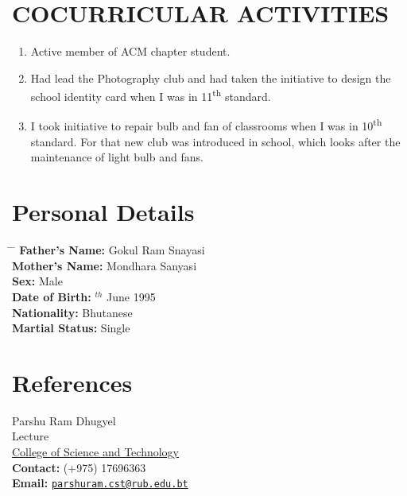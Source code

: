\documentclass[10pt]{article}
\begin{document}
	\section{COCURRICULAR ACTIVITIES}
	\begin{enumerate}
		\item  {Active member of ACM chapter student.}
		\item  {Had lead the Photography club and had taken the initiative to design the school identity card when I was in 11\textsuperscript{th} standard.}
		\item  {I took initiative to repair bulb and fan of classrooms when I was in 10\textsuperscript{th} standard. For that new club was introduced in school, which looks after the maintenance of light bulb and fans.}
	\end{enumerate}

	\section{Personal Details}
	\begin{tabbing} 
		\hspace{4cm} \= \hspace{10cm} \= \kill
		{\bf Father's Name: } \> Gokul Ram Snayasi\\
		{\bf Mother's Name:  } \> Mondhara Sanyasi\\
		{\bf Sex: } \> Male\\
		{\bf Date of Birth: } $^{th}$ June 1995 \\
		{\bf Nationality:  }\> Bhutanese\\
		{\bf Martial Status: }\> Single\\
	\end{tabbing}	

	\section{References}
	Parshu Ram Dhugyel\\
	Lecture\\
	\href{http://cst.edu.bt/}{ College of Science and Technology} \\
	{\bf Contact: } (+975) 17696363\\
	{\bf Email: } \href{mailto:parshuram.cst@rub.edu.bt}{\tt parshuram.cst@rub.edu.bt} \\
\end{document}
